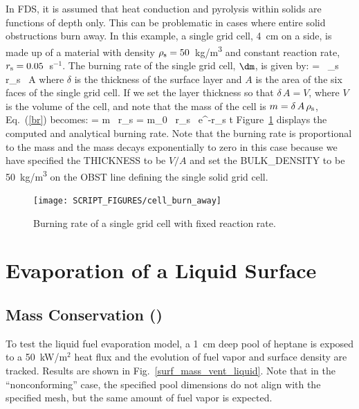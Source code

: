 \documentclass[11pt]{book}
\begin{document}
In FDS, it is assumed that heat conduction and pyrolysis within solids are functions of depth only. This can be problematic in cases where entire solid obstructions burn away. In this example, a single grid cell, 4~cm on a side, is made up of a material with density $\rho_{\rm s}=50$~\si{kg/m^3} and constant reaction rate, $r_{\rm s}=0.05$~s$^{-1}$. The burning rate of the single grid cell, $\dm$, is given by:
\be
   \dm = \delta \, \rho_{\rm s} \, r_{\rm s} \, A  \label{br}
\ee
where $\delta$ is the thickness of the surface layer and $A$ is the area of the six faces of the single grid cell. If we set the layer thickness so that $\delta \, A=V$, where $V$ is the volume of the cell, and note that the mass of the cell is $m=\delta \, A \, \rho_{\rm s}$, Eq.~(\ref{br}) becomes:
\be
   \dm = m \, r_{\rm s} = m_0 \, r_{\rm s} \, {\rm e}^{-r_{\rm s} t}
\ee
Figure~\ref{cell_burn_away_fig} displays the computed and analytical burning rate. Note that the burning rate is proportional to the mass and the mass decays exponentially to zero in this case because we have specified the {\ct THICKNESS} to be $V/A$ and set the {\ct BULK\_DENSITY} to be 50~\si{kg/m^3} on the {\ct OBST} line defining the single solid grid cell.
\begin{figure}[!htb]
\centering
\texttt{[image: SCRIPT\_FIGURES/cell\_burn\_away]}
\caption[The {\ct cell\_burn\_away} test case]{Burning rate of a single grid cell with fixed reaction rate.}
\label{cell_burn_away_fig}
\end{figure}


\section{Evaporation of a Liquid Surface}

\subsection{Mass Conservation (\texorpdfstring{}{surf\_mass\_vent\_liquid})}
\label{surf_mass_vent_liquid_fuel}
\label{surf_mass_vent_liquid_fuel_nonconforming}

To test the liquid fuel evaporation model, a 1~cm deep pool of heptane is exposed to a 50~kW/m$^2$ heat flux and the evolution of fuel vapor and surface density are tracked. Results are shown in Fig.~\ref{surf_mass_vent_liquid}. Note that in the ``nonconforming'' case, the specified pool dimensions do not align with the specified mesh, but the same amount of fuel vapor is expected.
\end{document}
